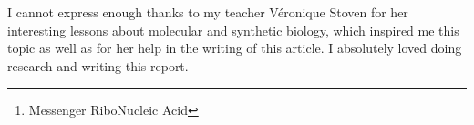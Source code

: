     \begin{abstract}        
        In a context of a pandemic and major doubts towards vaccination among populations, this paper deals with vaccine strategies, especially how mRNA vaccines are revolutionizing them.
        It is clear that immunology represents a complex field of science,
            and nowadays the breakthroughs in biotechnologies are offering new possibilities to accelerate vaccine development, efficiency and safety as well as a better understanding of
            our immune system.
        This paper aims at summarizing the different vaccine techniques with a special attention to mRNA vaccines\footnote{Messenger RiboNucleic Acid}, in order to
            have an overview of the current vaccine strategies which are going to evolve.
    \end{abstract}

        
    \begin{remerciements}
        I cannot express enough thanks to my teacher Véronique Stoven for her interesting lessons about molecular and synthetic biology,
            which inspired me this topic as well as for her help in the writing of this article.
        I absolutely loved doing research and writing this report.
    \end{remerciements}


    \tableofcontents


    \newpage

    \makeatother